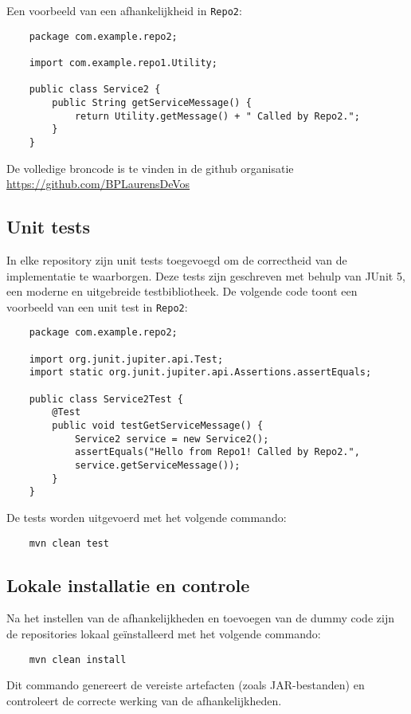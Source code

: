 Een voorbeeld van een afhankelijkheid in \texttt{Repo2}:

\begin{verbatim}
    package com.example.repo2;
    
    import com.example.repo1.Utility;
    
    public class Service2 {
        public String getServiceMessage() {
            return Utility.getMessage() + " Called by Repo2.";
        }
    }
\end{verbatim}

De volledige broncode is te vinden in de github organisatie \url{https://github.com/BPLaurensDeVos}

\subsection{Unit tests}
In elke repository zijn unit tests toegevoegd om de correctheid van de implementatie te waarborgen. Deze tests zijn geschreven met behulp van JUnit 5, een moderne en uitgebreide testbibliotheek. De volgende code toont een voorbeeld van een unit test in \texttt{Repo2}:

\begin{verbatim}
    package com.example.repo2;
    
    import org.junit.jupiter.api.Test;
    import static org.junit.jupiter.api.Assertions.assertEquals;
    
    public class Service2Test {
        @Test
        public void testGetServiceMessage() {
            Service2 service = new Service2();
            assertEquals("Hello from Repo1! Called by Repo2.", 
            service.getServiceMessage());
        }
    }
\end{verbatim}

De tests worden uitgevoerd met het volgende commando:
\begin{verbatim}
    mvn clean test
\end{verbatim}

\subsection{Lokale installatie en controle}
Na het instellen van de afhankelijkheden en toevoegen van de dummy code zijn de repositories lokaal geïnstalleerd met het volgende commando:
\begin{verbatim}
    mvn clean install
\end{verbatim}

Dit commando genereert de vereiste artefacten (zoals JAR-bestanden) en controleert de correcte werking van de afhankelijkheden.

